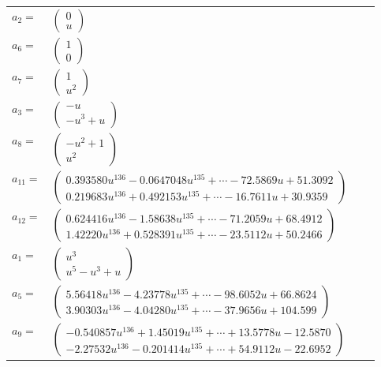 \documentclass[1p]{elsarticle_modified}
\theoremstyle{definition}
\begin{document}
\begin{tabular}{m{7pt} m{180pt} m{7pt} m{180pt} }
\flushright $a_{2}=$&$\begin{pmatrix}0\\u\end{pmatrix}$ \\
\flushright $a_{6}=$&$\begin{pmatrix}1\\0\end{pmatrix}$ \\
\flushright $a_{7}=$&$\begin{pmatrix}1\\u^2\end{pmatrix}$ \\
\flushright $a_{3}=$&$\begin{pmatrix}- u\\- u^3+u\end{pmatrix}$ \\
\flushright $a_{8}=$&$\begin{pmatrix}- u^2+1\\u^2\end{pmatrix}$ \\
\flushright $a_{11}=$&$\begin{pmatrix}0.393580 u^{136}-0.0647048 u^{135}+\cdots-72.5869 u+51.3092\\0.219683 u^{136}+0.492153 u^{135}+\cdots-16.7611 u+30.9359\end{pmatrix}$ \\
\flushright $a_{12}=$&$\begin{pmatrix}0.624416 u^{136}-1.58638 u^{135}+\cdots-71.2059 u+68.4912\\1.42220 u^{136}+0.528391 u^{135}+\cdots-23.5112 u+50.2466\end{pmatrix}$ \\
\flushright $a_{1}=$&$\begin{pmatrix}u^3\\u^5- u^3+u\end{pmatrix}$ \\
\flushright $a_{5}=$&$\begin{pmatrix}5.56418 u^{136}-4.23778 u^{135}+\cdots-98.6052 u+66.8624\\3.90303 u^{136}-4.04280 u^{135}+\cdots-37.9656 u+104.599\end{pmatrix}$ \\
\flushright $a_{9}=$&$\begin{pmatrix}-0.540857 u^{136}+1.45019 u^{135}+\cdots+13.5778 u-12.5870\\-2.27532 u^{136}-0.201414 u^{135}+\cdots+54.9112 u-22.6952\end{pmatrix}$ \\

\end{tabular}
\end{document}
